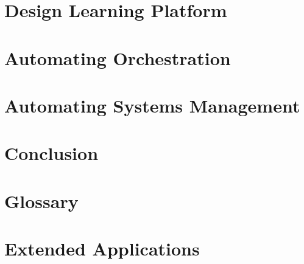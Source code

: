 \documentclass{article}
\begin{document}
\section{Design Learning Platform}



\newpage
\section{Automating Orchestration}



\newpage
\section{Automating Systems Management}



\newpage
\section{Conclusion}


\newpage
\section{Glossary}


\newpage
\section{Extended Applications}

\end{document}
